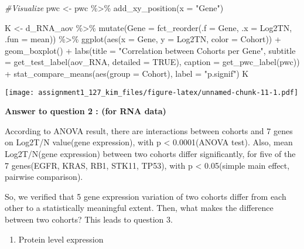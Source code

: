 \documentclass[
]{article}
\newenvironment{Shaded}{\begin{snugshade}}{\end{snugshade}}
\newcommand{\AttributeTok}[1]{\textcolor[rgb]{0.77,0.63,0.00}{#1}}
\newcommand{\CommentTok}[1]{\textcolor[rgb]{0.56,0.35,0.01}{\textit{#1}}}
\newcommand{\ConstantTok}[1]{\textcolor[rgb]{0.00,0.00,0.00}{#1}}
\newcommand{\FunctionTok}[1]{\textcolor[rgb]{0.00,0.00,0.00}{#1}}
\newcommand{\NormalTok}[1]{#1}
\newcommand{\OtherTok}[1]{\textcolor[rgb]{0.56,0.35,0.01}{#1}}
\newcommand{\SpecialCharTok}[1]{\textcolor[rgb]{0.00,0.00,0.00}{#1}}
\newcommand{\StringTok}[1]{\textcolor[rgb]{0.31,0.60,0.02}{#1}}
\providecommand{\tightlist}{%
  \setlength{\itemsep}{0pt}\setlength{\parskip}{0pt}}
\begin{document}
\begin{Shaded}
\begin{Highlighting}[]
\CommentTok{\#Visualize}
\NormalTok{pwc }\OtherTok{\textless{}{-}}\NormalTok{ pwc }\SpecialCharTok{\%\textgreater{}\%} \FunctionTok{add\_xy\_position}\NormalTok{(}\AttributeTok{x =} \StringTok{"Gene"}\NormalTok{)}

\NormalTok{K }\OtherTok{\textless{}{-}}\NormalTok{ d\_RNA\_aov }\SpecialCharTok{\%\textgreater{}\%}
  \FunctionTok{mutate}\NormalTok{(}\AttributeTok{Gene =} \FunctionTok{fct\_reorder}\NormalTok{(}\AttributeTok{.f =}\NormalTok{ Gene, }\AttributeTok{.x =}\NormalTok{ Log2TN, }\AttributeTok{.fun =}\NormalTok{ mean)) }\SpecialCharTok{\%\textgreater{}\%}
  \FunctionTok{ggplot}\NormalTok{(}\FunctionTok{aes}\NormalTok{(}\AttributeTok{x =}\NormalTok{ Gene, }\AttributeTok{y =}\NormalTok{ Log2TN, }\AttributeTok{color =}\NormalTok{ Cohort)) }\SpecialCharTok{+}
  \FunctionTok{geom\_boxplot}\NormalTok{() }\SpecialCharTok{+}
  \FunctionTok{labs}\NormalTok{(}\AttributeTok{title =} \StringTok{"Correlation between Cohorts per Gene"}\NormalTok{,}
    \AttributeTok{subtitle =} \FunctionTok{get\_test\_label}\NormalTok{(aov\_RNA, }\AttributeTok{detailed =} \ConstantTok{TRUE}\NormalTok{),}
    \AttributeTok{caption =} \FunctionTok{get\_pwc\_label}\NormalTok{(pwc)) }\SpecialCharTok{+}
  \FunctionTok{stat\_compare\_means}\NormalTok{(}\FunctionTok{aes}\NormalTok{(}\AttributeTok{group =}\NormalTok{ Cohort), }\AttributeTok{label =} \StringTok{"p.signif"}\NormalTok{)}
\NormalTok{K}
\end{Highlighting}
\end{Shaded}

\texttt{[image: assignment1\_127\_kim\_files/figure-latex/unnamed-chunk-11-1.pdf]}

\textbf{Answer to question 2 : (for RNA data)}

According to ANOVA result, there are interactions between cohorts and 7
genes on Log2T/N value(gene expression), with p \textless{} 0.0001(ANOVA
test). Also, mean Log2T/N(gene expression) between two cohorts differ
significantly, for five of the 7 genes(EGFR, KRAS, RB1, STK11, TP53),
with p \textless{} 0.05(simple main effect, pairwise comparison).

So, we verified that 5 gene expression variation of two cohorts differ
from each other to a statistically meaningful extent. Then, what makes
the difference between two cohorts? This leads to question 3.

\begin{enumerate}
\def\labelenumi{\arabic{enumi})}
\setcounter{enumi}{1}
\tightlist
\item
  Protein level expression
\end{enumerate}
\end{document}
